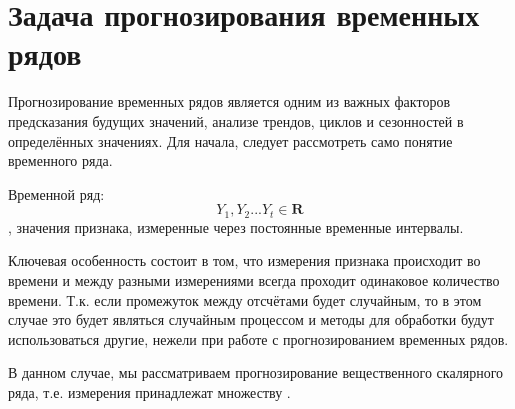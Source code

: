 \section{Задача прогнозирования временных рядов}
\label{sec:purpose}

Прогнозирование временных рядов является одним из важных факторов предсказания будущих значений, анализе трендов, циклов и сезонностей в определённых
значениях. Для начала, следует рассмотреть само понятие временного ряда.

Временной ряд: \begin{equation}\label{timeline_value} Y_1, Y_2 ... Y_t \in \mathbf{R}  \end{equation}, значения признака, измеренные через постоянные временные интервалы.

Ключевая особенность состоит в том, что измерения признака происходит во времени и между разными измерениями всегда проходит одинаковое количество времени.
Т.к. если промежуток между отсчётами будет случайным, то в этом случае это будет являться случайным процессом и методы для обработки будут использоваться другие, нежели
при работе с прогнозированием временных рядов.

В данном случае, мы рассматриваем прогнозирование вещественного скалярного ряда, т.е. измерения принадлежат множеству .